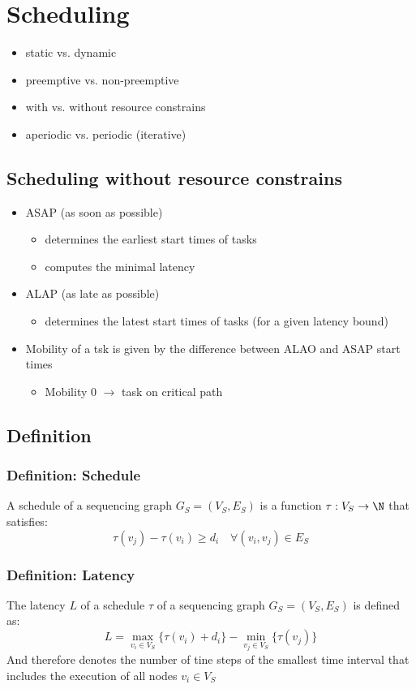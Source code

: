 \section{Scheduling}
\begin{itemize}
	\item static vs. dynamic
	\item preemptive vs. non-preemptive
	\item with vs. without resource constrains
	\item aperiodic vs. periodic (iterative)
\end{itemize}

\subsection{Scheduling without resource constrains}
\begin{itemize}
	\item ASAP (as soon as possible)
\begin{itemize}
	\item determines the earliest start times of tasks
	\item computes the minimal latency
\end{itemize}
\item ALAP (as late as possible)
\begin{itemize}
	\item determines the latest start times of tasks (for a given latency bound) 
\end{itemize}
\item Mobility of a tsk is given by the difference between ALAO and ASAP start times
\begin{itemize}
	\item Mobility 0 $\rightarrow$ task on critical path
\end{itemize}
\end{itemize}

\subsection{Definition}
\subsubsection{Definition: Schedule}
A schedule of a sequencing graph $G_S = (V_S, E_S)$ is a function $\tau: V_S \rightarrow \N$ that satisfies:
$$
	\tau(v_j) - \tau(v_i) \geq d_i \quad \forall(v_i, v_j)\in E_S
$$ 

\subsubsection{Definition: Latency}
The latency $L$ of a schedule $\tau$ of a sequencing graph $G_S = (V_S, E_S)$ is defined as:
$$
	L = \max_{v_i \in V_S} \{\tau(v_i) + d_i\} - \min_{v_j \in V_S} \{\tau(v_j)\}
$$
And therefore denotes the number of tine steps of the smallest time interval that includes the execution of all nodes $v_i \in V_S$

